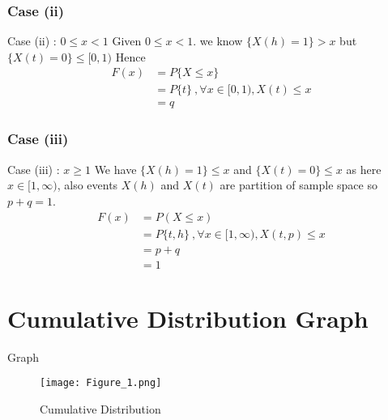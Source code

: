 \documentclass{beamer}
\begin{document}
     \subsubsection{Case (ii)}
      \begin{frame}{Case (ii) : $0 \le x < 1$}
      Given $0 \le x < 1$. we know $\{X(h) = 1\} > x$ but  $\{X(t) = 0\} \le [0,1)$ Hence \\
      \begin{align}
      F(x) &= P\{X \le x \} \nonumber \\
        &=  P\{t\} \:, \forall x \in [0,1),X(t) \le x \nonumber \\
        &=  q 
      \end{align}
      
      \end{frame}
      
      
      \subsubsection{Case (iii)}
      \begin{frame}{Case (iii) : $ x \ge 1$}
      We have $\{X(h)=1\} \le x$ and $\{X(t)= 0\} \le x$ as
      here $x \in [1,\infty)$, also events $X(h)$ and $X(t)$
      are partition of sample space so $p+q = 1$.\\
      \begin{align}
          F(x) &= P(X \le x) \nonumber \\
            &= P\{t,h\} \:,\forall x \in [1,\infty),X(t,p) \le x \nonumber \\
            &= p+q  \nonumber \\
            &= 1 
      \end{align}
          
      \end{frame}
      
      \section{Cumulative Distribution Graph}
      \begin{frame}{Graph}
          \begin{figure}
              \centering
              \texttt{[image: Figure\_1.png]}
              \caption{Cumulative Distribution}
              \label{fig:my_CDG}
          \end{figure}
      \end{frame}
\end{document}
